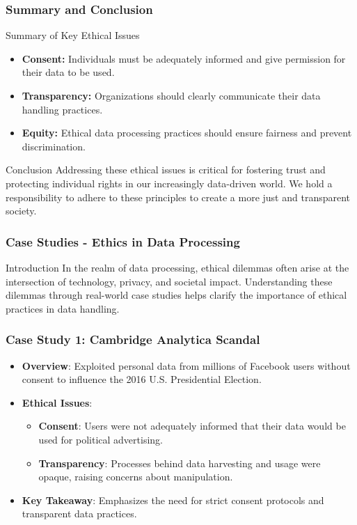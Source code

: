 \documentclass[aspectratio=169]{beamer}
\begin{document}
\begin{frame}[fragile]
    \frametitle{Summary and Conclusion}
    \begin{block}{Summary of Key Ethical Issues}
        \begin{itemize}
            \item \textbf{Consent:} Individuals must be adequately informed and give permission for their data to be used.
            \item \textbf{Transparency:} Organizations should clearly communicate their data handling practices.
            \item \textbf{Equity:} Ethical data processing practices should ensure fairness and prevent discrimination.
        \end{itemize}
    \end{block}

    \begin{block}{Conclusion}
        Addressing these ethical issues is critical for fostering trust and protecting individual rights in our increasingly data-driven world. We hold a responsibility to adhere to these principles to create a more just and transparent society.
    \end{block}
\end{frame}

\begin{frame}[fragile]
    \frametitle{Case Studies - Ethics in Data Processing}
    \begin{block}{Introduction}
        In the realm of data processing, ethical dilemmas often arise at the intersection of technology, privacy, and societal impact. Understanding these dilemmas through real-world case studies helps clarify the importance of ethical practices in data handling.
    \end{block}
\end{frame}

\begin{frame}[fragile]
    \frametitle{Case Study 1: Cambridge Analytica Scandal}
    \begin{itemize}
        \item \textbf{Overview}: Exploited personal data from millions of Facebook users without consent to influence the 2016 U.S. Presidential Election.
        \item \textbf{Ethical Issues}:
            \begin{itemize}
                \item \textbf{Consent}: Users were not adequately informed that their data would be used for political advertising.
                \item \textbf{Transparency}: Processes behind data harvesting and usage were opaque, raising concerns about manipulation.
            \end{itemize}
        \item \textbf{Key Takeaway}: Emphasizes the need for strict consent protocols and transparent data practices.
    \end{itemize}
\end{frame}
\end{document}
